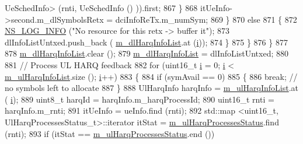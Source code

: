 \begin{DoxyCode}
       UeSchedInfo> (rnti, UeSchedInfo () )).first;
867                                         \}
868                                         itUeInfo->second.m\_dlSymbolsRetx = dciInfoReTx.m\_numSym;
869                                 \}
870                                 \textcolor{keywordflow}{else}
871                                 \{
872                                         \hyperlink{group__logging_gafbd73ee2cf9f26b319f49086d8e860fb}{NS\_LOG\_INFO} (\textcolor{stringliteral}{"No resource for this retx -> buffer it"});
873                                         dlInfoListUntxed.push\_back (
      \hyperlink{classns3_1_1MmWaveFlexTtiMacScheduler_af30d399e8abceedfe762a84ea26336b6}{m\_dlHarqInfoList}.at (\hyperlink{bernuolliDistribution_8m_a6f6ccfcf58b31cb6412107d9d5281426}{i}));
874                                 \}
875                         \}
876                 \}
877 
878                 \hyperlink{classns3_1_1MmWaveFlexTtiMacScheduler_af30d399e8abceedfe762a84ea26336b6}{m\_dlHarqInfoList}.clear ();
879                 \hyperlink{classns3_1_1MmWaveFlexTtiMacScheduler_af30d399e8abceedfe762a84ea26336b6}{m\_dlHarqInfoList} = dlInfoListUntxed;
880 
881                 \textcolor{comment}{// Process UL HARQ feedback}
882                 \textcolor{keywordflow}{for} (uint16\_t \hyperlink{bernuolliDistribution_8m_a6f6ccfcf58b31cb6412107d9d5281426}{i} = 0; \hyperlink{bernuolliDistribution_8m_a6f6ccfcf58b31cb6412107d9d5281426}{i} < \hyperlink{classns3_1_1MmWaveFlexTtiMacScheduler_ae98000612167824fd24cdca1f812bc60}{m\_ulHarqInfoList}.size (); 
      \hyperlink{bernuolliDistribution_8m_a6f6ccfcf58b31cb6412107d9d5281426}{i}++)
883                 \{
884                         \textcolor{keywordflow}{if} (symAvail == 0)
885                         \{
886                                 \textcolor{keywordflow}{break};  \textcolor{comment}{// no symbols left to allocate}
887                         \}
888                         UlHarqInfo harqInfo = \hyperlink{classns3_1_1MmWaveFlexTtiMacScheduler_ae98000612167824fd24cdca1f812bc60}{m\_ulHarqInfoList}.at (
      \hyperlink{bernuolliDistribution_8m_a6f6ccfcf58b31cb6412107d9d5281426}{i});
889                         uint8\_t harqId = harqInfo.m\_harqProcessId;
890                         uint16\_t rnti = harqInfo.m\_rnti;
891                         itUeInfo = ueInfo.find (rnti);
892                         std::map <uint16\_t, UlHarqProcessesStatus\_t>::iterator itStat = 
      \hyperlink{classns3_1_1MmWaveFlexTtiMacScheduler_af728e6ddeaaf55536ca842682904d64a}{m\_ulHarqProcessesStatus}.find (rnti);
893                         \textcolor{keywordflow}{if} (itStat == \hyperlink{classns3_1_1MmWaveFlexTtiMacScheduler_af728e6ddeaaf55536ca842682904d64a}{m\_ulHarqProcessesStatus}.end ())

\end{DoxyCode}
